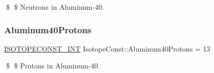\$ \$ Neutrons in Aluminum-\/40. \mbox{\label{group___isotope_const-_aluminum-_al40_ga75bfd045664bed8063646a14a793636e}} 
\subsubsection{\texorpdfstring{Aluminum40\+Protons}{Aluminum40Protons}}
{\footnotesize\ttfamily \mbox{\hyperlink{group___isotope_const-_macros_ga5f18360b3e99483a35c32d789e62621c}{I\+S\+O\+T\+O\+P\+E\+C\+O\+N\+S\+T\+\_\+\+I\+NT}} Isotope\+Const\+::\+Aluminum40\+Protons = 13}

\$ \$ Protons in Aluminum-\/40. 